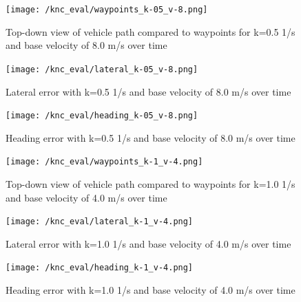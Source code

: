 \documentclass[titlepage, draft]{article}
\begin{document}
{\begin{figure}[H]
	\centering
	\begin{minipage}{.45\textwidth}
		\centering
		\texttt{[image: /knc\_eval/waypoints\_k-05\_v-8.png]}
		\caption{Top-down view of vehicle path compared to waypoints for k=0.5 1/s and base velocity of 8.0 m/s over time}
		\label{fig:wayk5v8}
	\end{minipage}%
	\hspace{0.1\textwidth}%
	\begin{minipage}{.45\textwidth}
		\centering
		\texttt{[image: /knc\_eval/lateral\_k-05\_v-8.png]}
		\caption{Lateral error with k=0.5 1/s and base velocity of 8.0 m/s over time}
		\label{fig:latk5v8}
	\end{minipage}
\end{figure}

\begin{figure}[H]
	\centering
	\begin{minipage}{.45\textwidth}
		\centering
		\texttt{[image: /knc\_eval/heading\_k-05\_v-8.png]}
		\caption{Heading error with k=0.5 1/s and base velocity of 8.0 m/s over time}
		\label{fig:headk5v8}
	\end{minipage}%
	\hspace{0.1\textwidth}%
	\begin{minipage}{.45\textwidth}
		\centering
		\texttt{[image: /knc\_eval/waypoints\_k-1\_v-4.png]}
		\caption{Top-down view of vehicle path compared to waypoints for k=1.0 1/s and base velocity of 4.0 m/s over time}
		\label{fig:wayk10v4}
	\end{minipage}
\end{figure}

\begin{figure}[H]
	\centering
	\begin{minipage}{.45\textwidth}
		\centering
		\texttt{[image: /knc\_eval/lateral\_k-1\_v-4.png]}
		\caption{Lateral error with k=1.0 1/s and base velocity of 4.0 m/s over time}
		\label{fig:latk10v4}
	\end{minipage}%
	\hspace{0.1\textwidth}%
	\begin{minipage}{.45\textwidth}
		\centering
		\texttt{[image: /knc\_eval/heading\_k-1\_v-4.png]}
		\caption{Heading error with k=1.0 1/s and base velocity of 4.0 m/s over time}
		\label{fig:headk10v4}
	\end{minipage}
\end{figure}


}
\end{document}
